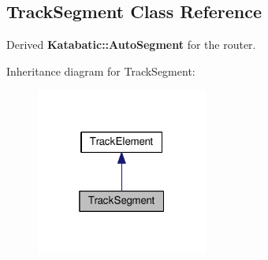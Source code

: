 \hypertarget{classKite_1_1TrackSegment}{}\subsection{Track\+Segment Class Reference}
\label{classKite_1_1TrackSegment}


Derived \textbf{ Katabatic\+::\+Auto\+Segment} for the router.  




Inheritance diagram for Track\+Segment\+:\nopagebreak
\begin{figure}[H]
\begin{center}
\leavevmode
\includegraphics[width=160pt]{classKite_1_1TrackSegment__inherit__graph}
\end{center}
\end{figure}

